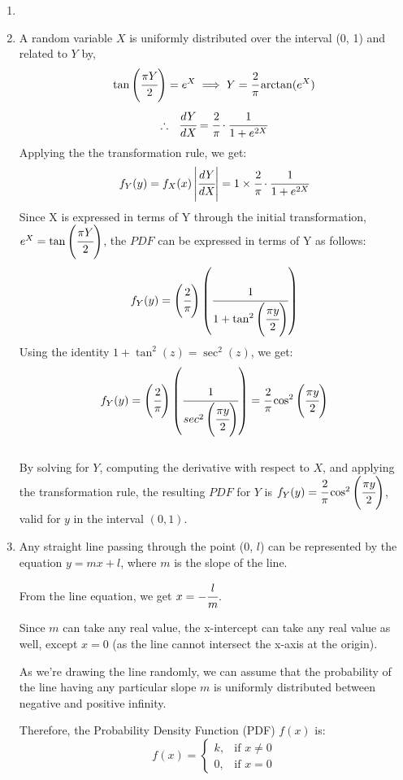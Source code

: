 \documentclass{article}
\begin{document}
\begin{enumerate}
\item 

\newpage
\item 
    A random variable \(X\) is uniformly distributed over the interval (0, 1) and related to \(Y\) by,
    \[
        \tan\left(\cfrac{\pi Y}{2}\right) = e^X \implies Y = \cfrac{2}{\pi}\arctan(e^X)
    \]
    \[
        \therefore\ \ \cfrac{dY}{dX} = \cfrac{2}{\pi}\cdot\cfrac{1}{1+e^{2X}}
    \]
    Applying the the transformation rule, we get:
    \[
        f_Y(y) = f_X(x)\left|\cfrac{dY}{dX}\right| = 1 \times \cfrac{2}{\pi}\cdot\cfrac{1}{1+e^{2X}}
    \]
    Since X is expressed in terms of Y through the initial transformation, $e^X = \tan\left(\cfrac{\pi Y}{2}\right)$, the \(PDF\) can be expressed in terms of Y as follows:
    \[
        f_Y(y) = \left(\cfrac{2}{\pi}\right)\left(\cfrac{1}{1+\tan^2\left(\cfrac{\pi y}{2}\right)}\right)
    \]
    Using the identity $1 + \tan^2(z) = \sec^2(z)$, we get:
    \[
        f_Y(y) = \left(\cfrac{2}{\pi}\right)\left(\cfrac{1}{sec^2\left(\cfrac{\pi y}{2}\right)}\right) = \cfrac{2}{\pi}\cos^2\left(\cfrac{\pi y}{2}\right)
    \]\\
    By solving for \(Y\), computing the derivative with respect to \(X\), and applying the transformation rule, the resulting \(PDF\) for \(Y\) is $f_Y(y) = \cfrac{2}{\pi}\cos^2\left(\cfrac{\pi y}{2}\right)$, valid for \(y\) in the interval $(0, 1)$.
    
\newpage
\item
    Any straight line passing through the point (0, \(l\)) can be represented by the equation $y = mx + l$, where $m$ is the slope of the line.

    From the line equation, we get $x = -\cfrac{l}{m}$.

    Since $m$ can take any real value, the x-intercept can take any real value as well, except $x=0$ (as the line cannot intersect the x-axis at the origin).
    
    As we're drawing the line randomly, we can assume that the probability of the line having any particular slope $m$ is uniformly distributed between negative and positive infinity.

    Therefore, the Probability Density Function (PDF) $f(x)$ is:
    \[
    f(x) = \begin{cases}
    k, & \text{if } x \neq 0\\
    0, & \text{if } x = 0
    \end{cases}
    \]


\end{enumerate}
\end{document}
